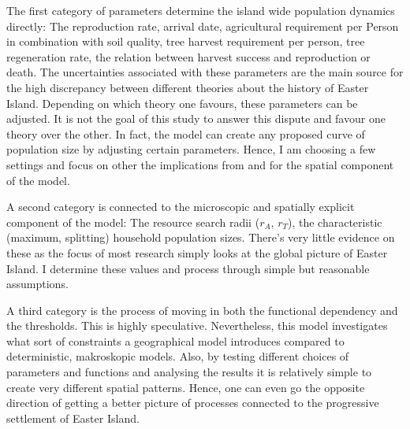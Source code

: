 The first category of parameters determine the island wide population dynamics directly: 
The reproduction rate, arrival date, agricultural requirement per Person in combination with soil quality, tree harvest requirement per person, tree regeneration rate, the relation between harvest success and reproduction or death.
The uncertainties associated with these parameters are the main source for the high 
discrepancy between different theories about the history of Easter Island.
Depending on which theory one favours, these parameters can be adjusted.
It is not the goal of this study to answer this dispute and favour one theory over the other.
In fact, the model can create any proposed curve of population size by adjusting certain parameters.
Hence, I am choosing a few settings and focus on other the implications from and for the spatial component of the model.

A second category is connected to the microscopic and spatially explicit component of the model:
The resource search radii ($r_A$, $r_T$), the characteristic (maximum, splitting) household population sizes. 
There's very little evidence on these as the focus of most research simply looks at the global picture of Easter Island. 
I determine these values and process through simple but reasonable assumptions.

A third category is the process of moving in both the functional dependency and the thresholds.
This is highly speculative.
Nevertheless, this model investigates what sort of constraints a geographical model introduces compared to deterministic, makroskopic models.
Also, by testing different choices of parameters and functions and analysing the results it is relatively simple to create very different spatial patterns.
Hence, one can even go the opposite direction of getting a better picture of processes connected to the progressive settlement of Easter Island.





